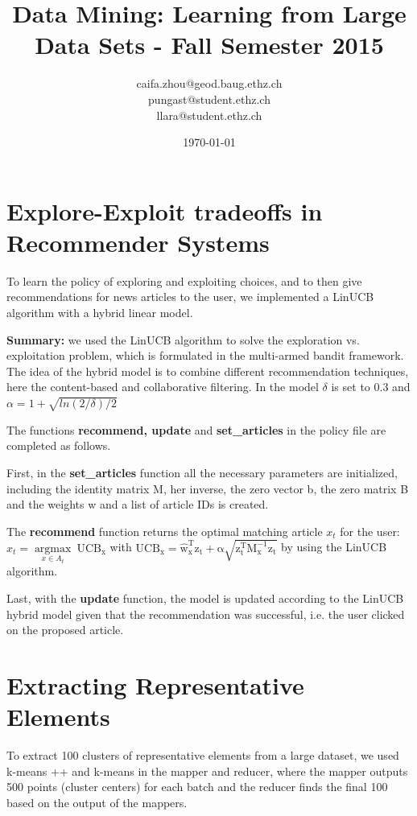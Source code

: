 \documentclass[a4paper, 11pt]{article}
\title{Data Mining: Learning from Large Data Sets - Fall Semester 2015}
\author{caifa.zhou@geod.baug.ethz.ch\\ pungast@student.ethz.ch\\ llara@student.ethz.ch\\}
\date{\today}
\begin{document}
\maketitle

\section*{Explore-Exploit tradeoffs in Recommender Systems} 

To learn the policy of exploring and exploiting choices, and to then give recommendations for news articles to the user, we implemented a LinUCB algorithm with a hybrid linear model.

\textbf{Summary:} we used the LinUCB algorithm to solve the exploration vs. exploitation problem, which is formulated in the multi-armed bandit framework. The idea of the hybrid model is to combine different recommendation techniques, here the content-based and collaborative filtering. In the model $\delta$ is set to 0.3 and $\alpha = 1 + \sqrt{ln(2/\delta)/2}$ 

The functions \textbf{recommend, update} and \textbf{set\_articles} in the policy file are completed as follows.  

First, in the \textbf{set\_articles} function all the necessary parameters are initialized, including the identity matrix M, her inverse, the zero vector b, the zero matrix B and the weights w and a list of article IDs is created.

The \textbf{recommend} function returns the optimal matching article $x_{t}$ for the user: 
$x_{t} = \underset{x\in A_{t}}{\operatorname{argmax}}~\mathrm{UCB_{x}}$ with $\mathrm{UCB_{x}} = \mathrm{\hat{w}_{x}^{T}z_{t} + \alpha \sqrt{z_{t}^{T}M_{x}^{-1}z_{t}}}$ by using the LinUCB algorithm. 

Last, with the \textbf{update} function, the model is updated according to the LinUCB hybrid model given that the recommendation was successful, i.e. the user clicked on the proposed article.

\pagebreak


\section*{Extracting Representative Elements} 

To extract 100 clusters of representative elements from a large dataset, we used k-means ++ and k-means in the mapper and reducer, where the mapper outputs 500 points (cluster centers) for each batch and the reducer finds the final 100 based on the output of the mappers.
\end{document}
